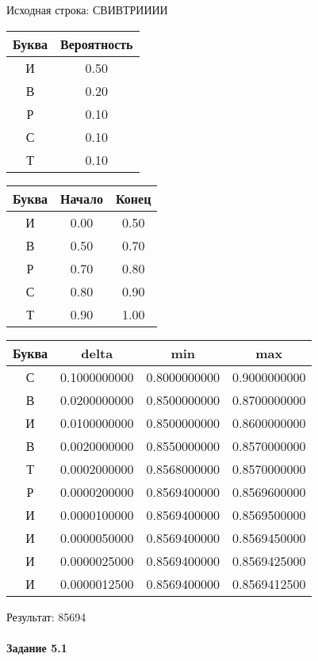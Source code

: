 \documentclass[a4paper, 12pt]{article}
\begin{document}
Исходная строка: СВИВТРИИИИ\
\begin{center}
 \begin{tabular}{ |c|c| } 
  \hline
     Буква & Вероятность \\ \hline
И & 0.50\\\hline
В & 0.20\\\hline
Р & 0.10\\\hline
С & 0.10\\\hline
Т & 0.10
\\ \hline \end{tabular}
\end{center}
\begin{center}
 \begin{tabular}{ |c|c|c| } 
  \hline
     Буква & Начало & Конец \\ \hline
И & 0.00 & 0.50\\\hline
В & 0.50 & 0.70\\\hline
Р & 0.70 & 0.80\\\hline
С & 0.80 & 0.90\\\hline
Т & 0.90 & 1.00
\\ \hline \end{tabular}
\end{center}
\begin{center}
 \begin{tabular}{ |c|c|c|c| } 
  \hline
     Буква & delta & min & max \\ \hline
С & 0.1000000000 & 0.8000000000 & 0.9000000000\\\hline
В & 0.0200000000 & 0.8500000000 & 0.8700000000\\\hline
И & 0.0100000000 & 0.8500000000 & 0.8600000000\\\hline
В & 0.0020000000 & 0.8550000000 & 0.8570000000\\\hline
Т & 0.0002000000 & 0.8568000000 & 0.8570000000\\\hline
Р & 0.0000200000 & 0.8569400000 & 0.8569600000\\\hline
И & 0.0000100000 & 0.8569400000 & 0.8569500000\\\hline
И & 0.0000050000 & 0.8569400000 & 0.8569450000\\\hline
И & 0.0000025000 & 0.8569400000 & 0.8569425000\\\hline
И & 0.0000012500 & 0.8569400000 & 0.8569412500
\\ \hline \end{tabular}
\end{center}
Результат: 85694
\pagebreak
\paragraph{Задание 5.1 \\
}
\end{document}
